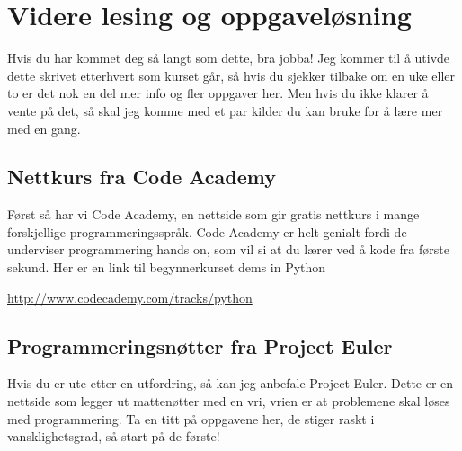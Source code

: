 \documentclass[a4paper, 11pt, notitlepage]{article}
\begin{document}


\clearpage

\section*{Videre lesing og oppgaveløsning}

Hvis du har kommet deg så langt som dette, bra jobba! Jeg kommer til å utivde dette skrivet etterhvert som kurset går, så hvis du sjekker tilbake om en uke eller to er det nok en del mer info og fler oppgaver her. Men hvis du ikke klarer å vente på det, så skal jeg komme med et par kilder du kan bruke for å lære mer med en gang.

\subsection*{Nettkurs fra Code Academy}

Først så har vi Code Academy, en nettside som gir gratis nettkurs i mange forskjellige programmeringsspråk. Code Academy er helt genialt fordi de underviser programmering hands on, som vil si at du lærer ved å kode fra første sekund. Her er en link til begynnerkurset dems in Python

\url{http://www.codecademy.com/tracks/python}


\subsection*{Programmeringsnøtter fra Project Euler}

Hvis du er ute etter en utfordring, så kan jeg anbefale Project Euler. Dette er en nettside som legger ut mattenøtter med en vri, vrien er at problemene skal løses med programmering. Ta en titt på oppgavene her, de stiger raskt i vansklighetsgrad, så start på de første!
\end{document}
